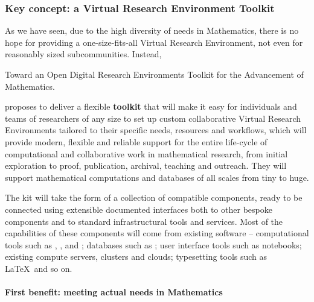 

\subsubsection{Key concept: a Virtual Research Environment Toolkit}

As we have seen, due to the high diversity of needs in Mathematics,
there is no hope for providing a one-size-fits-all Virtual Research
Environment, not even for reasonably sized subcommunities. Instead,

\begin{framed}
  Toward an Open Digital Research Environments Toolkit for the
  Advancement of Mathematics.

  \TheProject proposes to deliver a flexible \textbf{toolkit} that
  will make it easy for individuals and teams of researchers of any
  size to set up custom collaborative Virtual Research Environments
  tailored to their specific needs, resources and workflows, which
  will provide modern, flexible and reliable support for the entire
  life-cycle of computational and collaborative work in mathematical
  research, from initial exploration to proof, publication, archival,
  teaching and outreach. They will support mathematical computations
  and databases of all scales from tiny to huge.
\end{framed}

The kit will take the form of a collection of compatible components,
ready to be connected using extensible documented interfaces both to
other bespoke components and to standard infrastructural tools and
services. Most of the capabilities of these components will come from
existing software -- computational tools such as \Sage, \GAP,
\Singular and \Pari; databases such as \LMFDB; user interface tools
such as \Jupyter notebooks; existing compute servers, clusters and
clouds; typesetting tools such as \LaTeX\ and so on.

\paragraph{First benefit: meeting actual needs in Mathematics}

